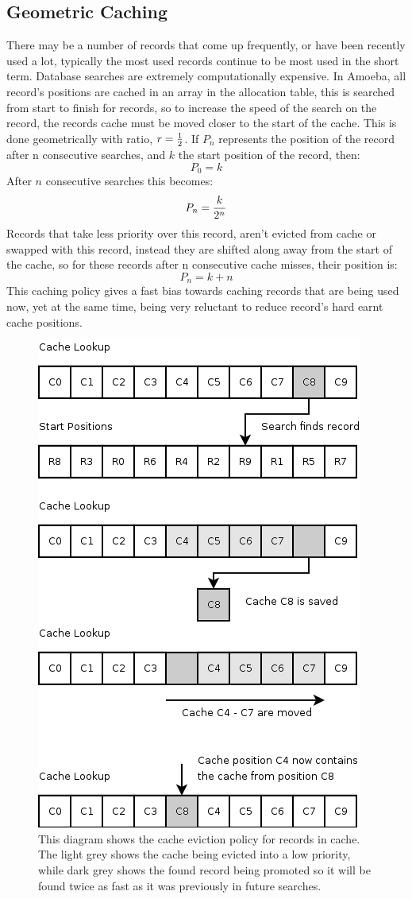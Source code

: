 \documentclass[11pt]{article}
\begin{document}
\subsection{Geometric Caching}
There may be a number of records that come up frequently, or have been recently used a lot, typically the most used records continue to be most used in the short term. Database searches are extremely computationally expensive. In Amoeba, all record's positions are cached in an array in the allocation table, this is searched from start to finish for records, so to increase the speed of the search on the record, the records cache must be moved closer to the start of the cache. This is done geometrically with ratio, $r={{1}\over{2}}$.
\newline
\newline
If $P_n$ represents the position of the record after n consecutive searches, and $k$ the start position of the record, then: 
$$
P_0=k
$$
After $n$ consecutive searches this becomes:
$$
P_n={{k}\over{2^n}}
$$
Records that take less priority over this record, aren't evicted from cache or swapped with this record, instead they are shifted along away from the start of the cache, so for these records after n consecutive cache misses, their position is:
$$
P_n=k+n
$$
This caching policy gives a fast bias towards caching records that are being used now, yet at the same time, being very reluctant to reduce record's hard earnt cache positions.
\begin{figure}[ht]
\centering
\includegraphics[scale=0.4]{CacheEviction1.png}
\caption{This diagram shows the cache eviction policy for records in cache. The light grey shows the cache being evicted into a low priority, while dark grey shows the found record being promoted so it will be found twice as fast as it was previously in future searches.}
\end{figure}
\end{document}
